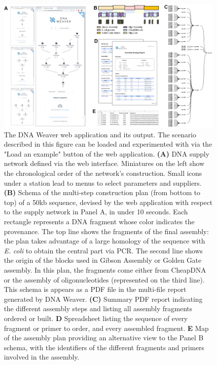 \begin{figure}[!tpb]
  \includegraphics[width=\textwidth]{figures/figure_2_app_screenshots.eps}
  \caption{The DNA Weaver web application and its output. The scenario described in this figure can be loaded and experimented with via the "Load an example" button of the web application.
\textbf{(A)} DNA supply network defined via the web interface. Miniatures on the left show the chronological order of the network's construction. Small icons under a station lead to menus to select parameters and suppliers.
\textbf{(B)} Schema of the multi-step construction plan (from bottom to top) of a 50kb sequence, devised by the web application with respect to the supply network in Panel A, in under 10 seconds. Each rectangle represents a DNA fragment whose color indicates the provenance. The top line shows the fragments of the final assembly: the plan takes advantage of a large homology of the sequence with \textit{E. coli} to obtain the central part via PCR. The second line shows the origin of the blocks used in Gibson Assembly or Golden Gate assembly. In this plan, the fragments come either from CheapDNA or the assembly of oligonucleotides (represented on the third line). This schema is appears as a PDF file in the multi-file report generated by DNA Weaver.
\textbf{(C)} Summary PDF report indicating the different assembly steps and listing all assembly fragments ordered or built.
\textbf{D} Spreadsheet listing the sequence of every fragment or primer to order, and every assembled fragment.
\textbf{E} Map of the assembly plan providing an alternative view to the Panel B schema, with the identifiers of the different fragments and primers involved in the assembly.}
  \label{app_screenshots}
\end{figure}



